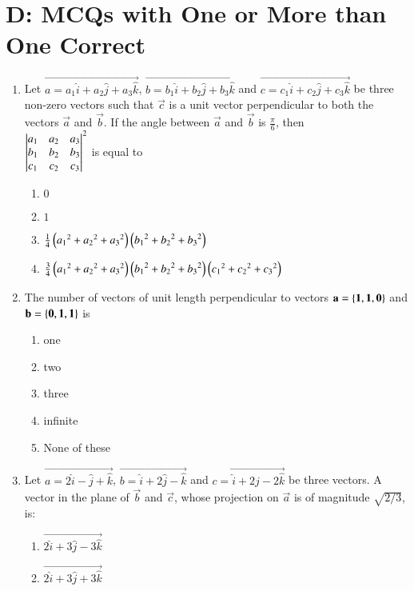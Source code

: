 \documentclass[journal,12pt,twocolumn]{IEEEtran}
\theoremstyle{remark}
\begin{document}
 \section{D: MCQs with One or More than One Correct}
\begin{enumerate}
	\item %
		Let $\vec{a=a_1\hat{i}+a_2\hat{j}+a_3\hat{k}}$, $\vec{b=b_1\hat{i}+b_2\hat{j}+b_3\hat{k}}$ and $\vec{c=c_1\hat{i}+c_2\hat{j}+c_3\hat{k}}$ be three non-zero vectors such that $\vec{c}$ is a unit vector perpendicular to both the vectors $\vec{a}$ and $\vec{b}$. If the angle between $\vec{a}$ and $\vec{b}$ is $\frac{\pi}{6}$, then \\
$
	\begin{vmatrix}
a_1 & a_2 & a_3 \\
b_1 & b_2 & b_3 \\
c_1 & c_2 & c_3
\end{vmatrix}^2
$
		is equal to \hfill{}\\
		\begin{enumerate}
			\item $0$
			\item $1$
			\item $\frac{1}{4}\left({a_1}^2+{a_2}^2+{a_3}^2\right)\left({b_1}^2+{b_2}^2+{b_3}^2\right)$
			\item $\frac{3}{4}\left({a_1}^2+{a_2}^2+{a_3}^2\right)\left({b_1}^2+{b_2}^2+{b_3}^2\right)\left({c_1}^2+{c_2}^2+{c_3}^2\right)$
		\end{enumerate}
\item %
	The number of vectors of unit length perpendicular to vectors $\mathbf{a=\left\{1,1,0\right\}}$ and $\mathbf{b=\left\{0,1,1\right\}}$ is \hfill{}\\
		\begin{enumerate}
			\item one
		        \item two
			\item three
			\item infinite
			\item None of these
		\end{enumerate}
\item %
	Let $\vec{a=2\hat{i}-\hat{j}+\hat{k}}$, $\vec{b=\hat{i}+2\hat{j}-\hat{k}}$ and $\vec{c=\hat{i}+2\hat{j}-2\hat{k}}$ be three vectors. A vector in the plane of $\vec{b}$ and $\vec{c}$, whose projection on $\vec{a}$ is of magnitude $\sqrt{2/3}$, is: \hfill{}\\
		\begin{enumerate}
			\item $\vec{2\hat{i}+3\hat{j}-3\hat{k}}$
			\item $\vec{2\hat{i}+3\hat{j}+3\hat{k}}$

\end{enumerate}
\end{enumerate}
\end{document}
